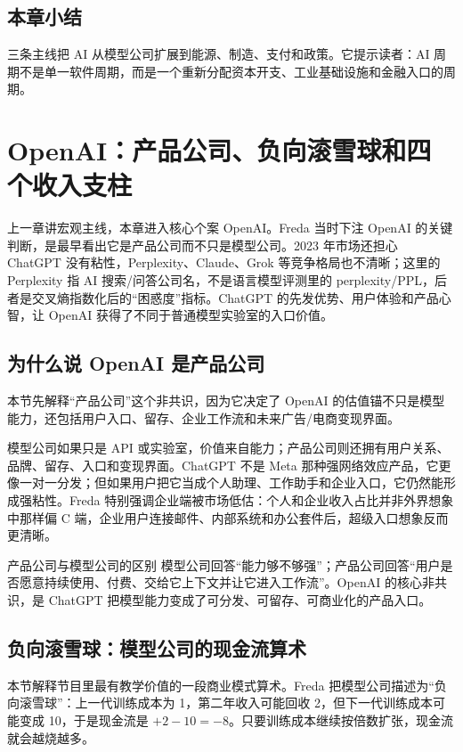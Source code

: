 \documentclass[a4paper]{article}
\begin{document}
\subsection{本章小结}

三条主线把 AI 从模型公司扩展到能源、制造、支付和政策。它提示读者：AI 周期不是单一软件周期，而是一个重新分配资本开支、工业基础设施和金融入口的周期。

\section{OpenAI：产品公司、负向滚雪球和四个收入支柱}

上一章讲宏观主线，本章进入核心个案 OpenAI。Freda 当时下注 OpenAI 的关键判断，是最早看出它是产品公司而不只是模型公司。2023 年市场还担心 ChatGPT 没有粘性，Perplexity、Claude、Grok 等竞争格局也不清晰；这里的 Perplexity 指 AI 搜索/问答公司名，不是语言模型评测里的 perplexity/PPL，后者是交叉熵指数化后的“困惑度”指标。ChatGPT 的先发优势、用户体验和产品心智，让 OpenAI 获得了不同于普通模型实验室的入口价值。

\subsection{为什么说 OpenAI 是产品公司}

本节先解释“产品公司”这个非共识，因为它决定了 OpenAI 的估值锚不只是模型能力，还包括用户入口、留存、企业工作流和未来广告/电商变现界面。

模型公司如果只是 API 或实验室，价值来自能力；产品公司则还拥有用户关系、品牌、留存、入口和变现界面。ChatGPT 不是 Meta 那种强网络效应产品，它更像一对一分发；但如果用户把它当成个人助理、工作助手和企业入口，它仍然能形成强粘性。Freda 特别强调企业端被市场低估：个人和企业收入占比并非外界想象中那样偏 C 端，企业用户连接邮件、内部系统和办公套件后，超级入口想象反而更清晰。

\begin{importantbox}{产品公司与模型公司的区别}
模型公司回答“能力够不够强”；产品公司回答“用户是否愿意持续使用、付费、交给它上下文并让它进入工作流”。OpenAI 的核心非共识，是 ChatGPT 把模型能力变成了可分发、可留存、可商业化的产品入口。
\end{importantbox}

\subsection{负向滚雪球：模型公司的现金流算术}

本节解释节目里最有教学价值的一段商业模式算术。Freda 把模型公司描述为“负向滚雪球”：上一代训练成本为 1，第二年收入可能回收 2，但下一代训练成本可能变成 10，于是现金流是 \(+2-10=-8\)。只要训练成本继续按倍数扩张，现金流就会越烧越多。
\end{document}

